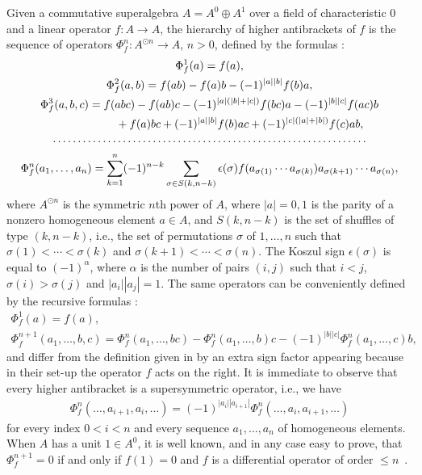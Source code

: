 \documentclass[11pt]{article}
\numberwithin{equation}{section}
\begin{document}
Given a commutative superalgebra $A=A^{0}\oplus A^{1}$ over a f\/ield of characteristic 0 and a linear operator $f\colon A\to A$, the hierarchy of higher antibrackets of $f$ is the sequence of operators $\Phi_f^n\colon A^{\odot n}\to A$, $n>0$, def\/ined by the formulas \cite{koszul85,markl2}:
\begin{gather}
\Phi^1_f(a)= f(a),\nonumber\\
\Phi^2_f(a,b)= f(ab)-f(a)b-(-1)^{|a||b|}f(b)a,\nonumber\\
\Phi^3_f(a,b,c)= f(abc)-f(ab)c-(-1)^{|a|(|b|+|c|)}f(bc)a-(-1)^{|b||c|}f(ac)b\nonumber\\
\hphantom{\Phi^3_f(a,b,c)=}{} +f(a)bc+(-1)^{|a||b|}f(b)ac+(-1)^{|c|(|a|+|b|)} f(c)ab ,\nonumber\\
\cdots\cdots\cdots\cdots\cdots\cdots\cdots\cdots\cdots\cdots\cdots\cdots\cdots\cdots\cdots\cdots\cdots\cdots\cdots\cdots\cdots\nonumber\\
\Phi^n_f(a_1,\ldots,a_n)= \sum_{k=1}^n(-1)^{n-k}\sum_{\sigma\in S(k,n-k)}\epsilon(\sigma)
f(a_{\sigma(1)}\cdots a_{\sigma(k)})a_{\sigma(k+1)}\cdots a_{\sigma(n)} ,\label{equ.defiKoszul}
\end{gather}
where $A^{\odot n}$ is the symmetric $n$th power of $A$, where $|a|=0,1$ is the parity of a nonzero homogeneous element $a\in A$, and
$S(k,n-k)$ is the set of shuf\/f\/les of type $(k,n-k)$, i.e., the set of permutations $\sigma$ of $1,\ldots,n$
such that $\sigma(1)<\cdots<\sigma(k)$ and $\sigma(k+1)<\cdots<\sigma(n)$. The Koszul sign
$\epsilon(\sigma)$ is equal to $(-1)^{\alpha}$, where $\alpha$ is the number of pairs $(i,j)$ such that
$i<j$, $\sigma(i)>\sigma(j)$ and $|a_i||a_j|=1$. The same operators can be conveniently def\/ined by the recursive formulas \cite{akman}:
\begin{gather}
\Phi^1_f(a)=f(a),\nonumber\\
\Phi^{n+1}_f(a_1,\ldots,b,c) = \Phi^{n}_f(a_1,\ldots,bc)-\Phi^{n}_f(a_1,\ldots,b)c-(-1)^{|b||c|}\Phi^{n}_f(a_1,\ldots,c)b,\label{equ.defiakman}
\end{gather}
and dif\/fer from the def\/inition given in \cite{alfaro,BDA} by an extra sign factor appearing because in their set-up the operator $f$ acts on the right.
It is immediate to observe that every higher antibracket is a supersymmetric operator, i.e., we have
\begin{gather*} \Phi_f^n(\ldots,a_{i+1},a_i,\ldots)=(-1)^{|a_i| |a_{i+1}|}\Phi_f^n(\ldots,a_{i},a_{i+1},\ldots)\end{gather*}
for every index $0<i<n$ and every sequence $a_1,\ldots,a_n$ of homogeneous elements.
When $A$ has a unit $1\in A^0$, it is well known, and in any case easy to prove, that $\Phi^{n+1}_f=0$
if and only if $f(1)=0$ and $f$ is a dif\/ferential operator of order $\le n$~\cite{koszul85}.
\end{document}
